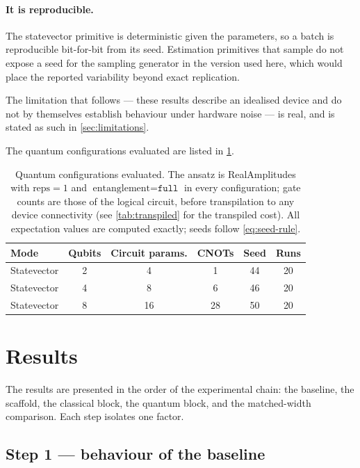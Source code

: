 \documentclass[aps,floatfix,superscriptaddress,twocolumn,tightenlines,amsmath,amssymb,nofootinbib,10pt,longbibliography,prl]{revtex4-2}
\begin{document}
\paragraph{It is reproducible.} The statevector primitive is deterministic given
the parameters, so a batch is reproducible bit-for-bit from its seed. Estimation
primitives that sample do not expose a seed for the sampling generator in the
version used here, which would place the reported variability beyond exact
replication.

The limitation that follows --- these results describe an idealised device and
do not by themselves establish behaviour under hardware noise --- is real, and
is stated as such in \ref{sec:limitations}.

The quantum configurations evaluated are listed in
\ref{tab:quantum-configs}.

\begin{table}[htbp]
  \centering
  \caption{Quantum configurations evaluated. The ansatz is RealAmplitudes with
  $\text{reps} = 1$ and $\text{entanglement} = \texttt{full}$ in every
  configuration; gate counts are those of the logical circuit, before
  transpilation to any device connectivity (see \ref{tab:transpiled} for the
  transpiled cost). All expectation values are computed exactly; seeds follow
  \ref{eq:seed-rule}.}
  \label{tab:quantum-configs}
  \begin{tabular}{lccccc}
    \toprule
    Mode & Qubits & Circuit params. & CNOTs & Seed & Runs \\
    \midrule
    Statevector & 2 & 4  & 1  & 44 & 20 \\
    Statevector & 4 & 8  & 6  & 46 & 20 \\
    Statevector & 8 & 16 & 28 & 50 & 20 \\
    \bottomrule
  \end{tabular}
\end{table}

\section{Results}
\label{sec:results}

The results are presented in the order of the experimental chain: the baseline,
the scaffold, the classical block, the quantum block, and the matched-width
comparison. Each step isolates one factor.

\FloatBarrier
\subsection{Step 1 --- behaviour of the baseline}
\label{subsec:res-baseline}
\end{document}
